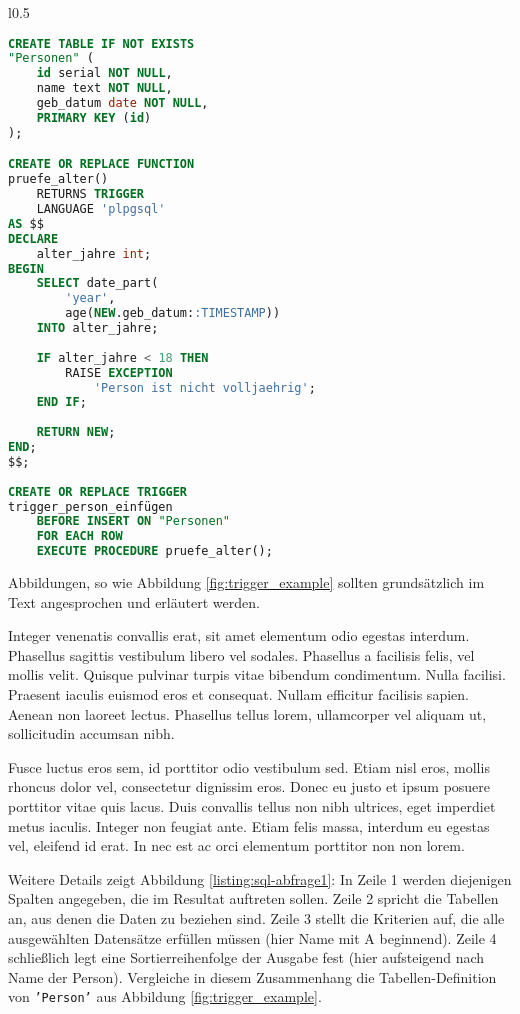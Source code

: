 \begin{wrapfigure}[26]{l}{0.5\linewidth}
\begin{lstlisting}[language=sql]
CREATE TABLE IF NOT EXISTS 
"Personen" (
    id serial NOT NULL,
    name text NOT NULL,
    geb_datum date NOT NULL,
    PRIMARY KEY (id)
);

CREATE OR REPLACE FUNCTION 
pruefe_alter()
    RETURNS TRIGGER
    LANGUAGE 'plpgsql'
AS $$
DECLARE
	alter_jahre int;
BEGIN
	SELECT date_part(
	    'year', 
	    age(NEW.geb_datum::TIMESTAMP))
	INTO alter_jahre;
	
	IF alter_jahre < 18 THEN
	    RAISE EXCEPTION 
	        'Person ist nicht volljaehrig';
	END IF;
	
	RETURN NEW;
END;
$$;
	
CREATE OR REPLACE TRIGGER 
trigger_person_einfügen
	BEFORE INSERT ON "Personen"
	FOR EACH ROW
	EXECUTE PROCEDURE pruefe_alter();
\end{lstlisting}
\captionsetup{type=figure}
\label{fig:trigger_example}
\end{wrapfigure}

Abbildungen, so wie Abbildung \vref{fig:trigger_example} sollten grundsätzlich im Text angesprochen und erläutert werden.

Integer venenatis convallis erat, sit amet elementum odio egestas interdum. Phasellus sagittis vestibulum libero vel sodales. Phasellus a facilisis felis, vel mollis velit. Quisque pulvinar turpis vitae bibendum condimentum. Nulla facilisi. Praesent iaculis euismod eros et consequat. Nullam efficitur facilisis sapien. Aenean non laoreet lectus. Phasellus tellus lorem, ullamcorper vel aliquam ut, sollicitudin accumsan nibh. 

Fusce luctus eros sem, id porttitor odio vestibulum sed. Etiam nisl eros, mollis rhoncus dolor vel, consectetur dignissim eros. Donec eu justo et ipsum posuere porttitor vitae quis lacus. Duis convallis tellus non nibh ultrices, eget imperdiet metus iaculis. Integer non feugiat ante. Etiam felis massa, interdum eu egestas vel, eleifend id erat. In nec est ac orci elementum porttitor non non lorem. 

\newpage
Weitere Details zeigt Abbildung \ref{listing:sql-abfrage1}: In Zeile 1 werden diejenigen Spalten angegeben, die im Resultat auftreten sollen.
Zeile 2 spricht die  Tabellen an, aus denen die Daten zu beziehen sind. Zeile 3 stellt die Kriterien auf, die alle ausgewählten Datensätze erfüllen müssen (hier Name mit A beginnend). Zeile 4 schließlich legt eine Sortierreihenfolge der Ausgabe fest (hier aufsteigend nach Name der Person). Vergleiche in diesem Zusammenhang die Tabellen-Definition von \texttt{'Person'} aus Abbildung \vref{fig:trigger_example}.


